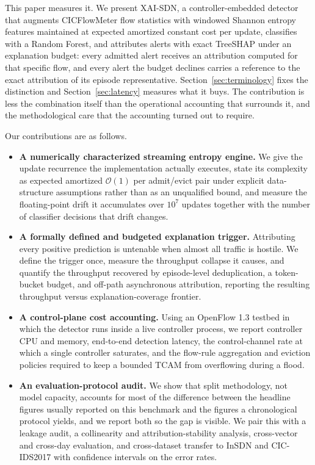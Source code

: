 \documentclass{ieeeaccess}
\begin{document}
This paper measures it. We present XAI-SDN, a controller-embedded detector that augments CICFlowMeter flow statistics with windowed Shannon entropy features maintained at expected amortized constant cost per update, classifies with a Random Forest, and attributes alerts with exact TreeSHAP under an explanation budget: every admitted alert receives an attribution computed for that specific flow, and every alert the budget declines carries a reference to the exact attribution of its episode representative. Section~\ref{sec:terminology} fixes the distinction and Section~\ref{sec:latency} measures what it buys. The contribution is less the combination itself than the operational accounting that surrounds it, and the methodological care that the accounting turned out to require.

Our contributions are as follows.

\begin{itemize}
\item \textbf{A numerically characterized streaming entropy engine.} We give the update recurrence the implementation actually executes, state its complexity as expected amortized $\mathcal{O}(1)$ per admit/evict pair under explicit data-structure assumptions rather than as an unqualified bound, and measure the floating-point drift it accumulates over $10^{7}$ updates together with the number of classifier decisions that drift changes.

\item \textbf{A formally defined and budgeted explanation trigger.} Attributing every positive prediction is untenable when almost all traffic is hostile. We define the trigger once, measure the throughput collapse it causes, and quantify the throughput recovered by episode-level deduplication, a token-bucket budget, and off-path asynchronous attribution, reporting the resulting throughput versus explanation-coverage frontier.

\item \textbf{A control-plane cost accounting.} Using an OpenFlow 1.3 testbed in which the detector runs inside a live controller process, we report controller CPU and memory, end-to-end detection latency, the control-channel rate at which a single controller saturates, and the flow-rule aggregation and eviction policies required to keep a bounded TCAM from overflowing during a flood.

\item \textbf{An evaluation-protocol audit.} We show that split methodology, not model capacity, accounts for most of the difference between the headline figures usually reported on this benchmark and the figures a chronological protocol yields, and we report both so the gap is visible. We pair this with a leakage audit, a collinearity and attribution-stability analysis, cross-vector and cross-day evaluation, and cross-dataset transfer to InSDN and CIC-IDS2017 with confidence intervals on the error rates.
\end{itemize}
\end{document}
